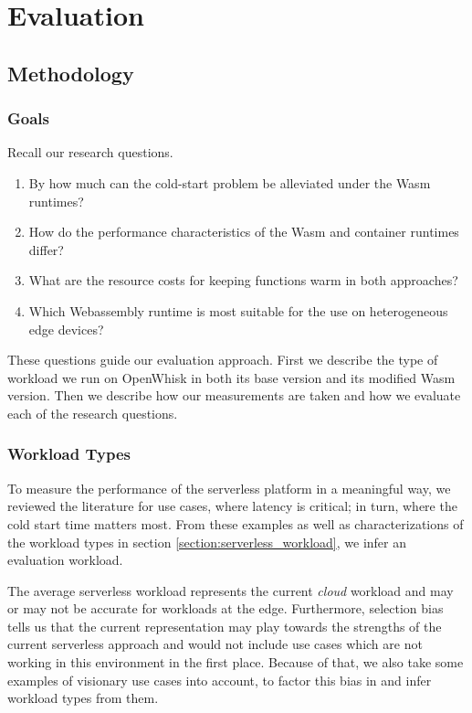 \chapter{Evaluation}
\label{chapter:evaluation}

\section{Methodology}

\subsection{Goals}

Recall our research questions.

\begin{enumerate}
    \item By how much can the cold-start problem be alleviated under the Wasm runtimes?
  
    \item How do the performance characteristics of the Wasm and container runtimes differ?
  
    \item What are the resource costs for keeping functions warm in both approaches?
  
    \item Which Webassembly runtime is most suitable for the use on heterogeneous edge devices?
\end{enumerate}

These questions guide our evaluation approach. First we describe the type of workload we run on OpenWhisk in both its base version and its modified Wasm version. Then we describe how our measurements are taken and how we evaluate each of the research questions. 

\subsection{Workload Types}

To measure the performance of the serverless platform in a meaningful way, we reviewed the literature for use cases, where latency is critical; in turn, where the cold start time matters most. From these examples as well as characterizations of the workload types in section \ref{section:serverless_workload}, we infer an evaluation workload.

The average serverless workload represents the current \emph{cloud} workload and may or may not be accurate for workloads at the edge. Furthermore, selection bias tells us that the current representation may play towards the strengths of the current serverless approach and would not include use cases which are not working in this environment in the first place. Because of that, we also take some examples of visionary use cases into account, to factor this bias in and infer workload types from them.

